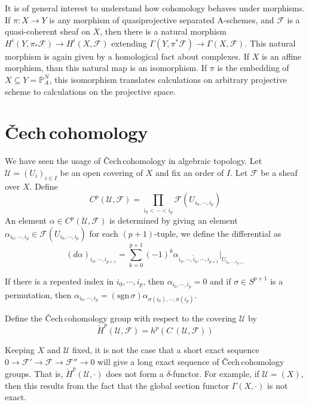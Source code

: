 \documentclass[12pt]{article}
\theoremstyle{plain}
\theoremstyle{definition}
\newcommand{\sU}{\mathcal{U}}
\newcommand{\IP}{\mathbb{P}}
\newcommand{\shF}{\mathscr{F}}
\newcommand{\<}{\langle}
\renewcommand{\>}{\rangle}
\def\what{\widehat}
\newcommand{\Cech}{\v{C}ech\,}
\begin{document}
It is of general interest to understand how cohomology behaves under morphisms. If $\pi : X \to Y$ is any morphism of quasiprojective separated A-schemes, and $\shF$ is a quasi-coherent sheaf on $X$, then there is a natural morphism $H^i(Y, \pi_* \shF ) \to H^i(X, \shF)$ extending $\Gamma(Y, \pi^* \shF) \to \Gamma(X, \shF)$. This natural morphism is again given by a homological fact about complexes. If $X$ is an affine morphism, than this natural map is an isomorphism. If $\pi$ is the embedding of $X \subseteq Y = \IP^N_A$, this isomorphism translates calculations on arbitrary projective scheme to calculations on the projective space. 



\section{\Cech cohomology}
We have seen the usage of \Cech cohomology in algebraic topology. Let $\sU = (U_i)_{i \in I}$ be an open covering of $X$ and fix an order of $I$. Let $\shF$ be a sheaf over $X$. Define 
$$ C^p(\sU, \shF) = \prod_{i_0 < \cdots < i_p} \shF(U_{i_0, \cdots, i_p}) $$
An element $\alpha \in C^p(\sU, \shF)$ is determined by giving an element $\alpha_{i_0, \cdots, i_p} \in \shF(U_{i_0, \cdots, i_p})$ for each $(p + 1)$-tuple, we define the differential as 
$$ (d\alpha)_{i_0, \cdots, i_{p+1}} = \sum_{k = 0}^{p + 1} (-1)^k \alpha_{i_0, \cdots, \what{i}_k, \cdots, i_{p+1}}|_{U_{i_0, \cdots, i_{p+1}}}$$

If there is a repeated index in $i_0, \cdots, i_p$, then $\alpha_{i_0, \cdots, i_p} = 0$ and if $\sigma \in S^{p+1}$ is a permutation, then $\alpha_{i_0, \cdots, i_p} = (\mathrm{sgn\,} \sigma) \alpha_{\sigma(i_0), \cdots, \sigma(i_p)}$.  

Define the \Cech cohomology group with respect to the covering $\sU$ by 
$$ \check{H}^p(\sU, \shF) = h^p(C^\cdot (\sU, \shF)) $$

Keeping $X$ and $\sU$ fixed, it is not the case that a short exact sequence 
$ 0 \to \shF' \to \shF \to \shF'' \to 0$ will give a long exact sequence of \Cech cohomology groups. That is, $\check{H}^p(\sU, \cdot)$ does not form a $\delta$-functor. For example, if $\sU = (X)$, then this results from the fact that the global section functor $\Gamma(X, \cdot)$ is not exact. 
\end{document}
